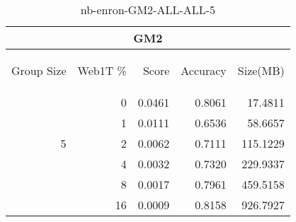 \begin{center}
\begin{table}[htbp]
\begin{tabular}{ | r | r | r | r | r |}
\hline
\multicolumn{5}{|c|}{GM2}\\
\hline
\begin{sideways}Group Size\end{sideways} & \begin{sideways}Web1T \%\end{sideways} & \begin{sideways}Score\end{sideways} & \begin{sideways}Accuracy\end{sideways} & \begin{sideways}Size(MB)\end{sideways}\\
\hline
\multirow{5}{*}{5}
 & 0 & 0.0461 & 0.8061 & 17.4811\\ \cline{2-5}
 & 1 & 0.0111 & 0.6536 & 58.6657\\ \cline{2-5}
 & 2 & 0.0062 & 0.7111 & 115.1229\\ \cline{2-5}
 & 4 & 0.0032 & 0.7320 & 229.9337\\ \cline{2-5}
 & 8 & 0.0017 & 0.7961 & 459.5158\\ \cline{2-5}
 & 16 & 0.0009 & 0.8158 & 926.7927\\ \cline{2-5}
\hline
\end{tabular}
\caption{nb-enron-GM2-ALL-ALL-5}
\label{table:nb-enron-GM2-ALL-ALL-5}
\end{table}
\end{center}

